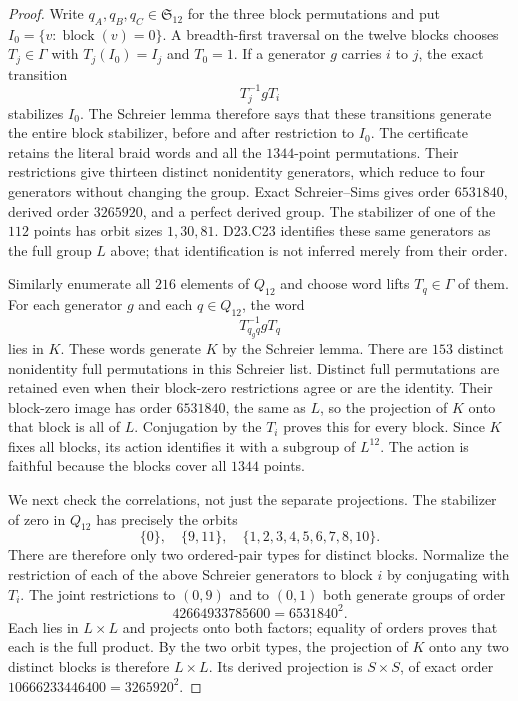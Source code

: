 \begin{proof}
Write $q_A,q_B,q_C\in\mathfrak S_{12}$ for the three block
permutations and put $I_0=\{v:\operatorname{block}(v)=0\}$.
A breadth-first traversal on the twelve blocks chooses
$T_j\in\Gamma$ with $T_j(I_0)=I_j$ and $T_0=1$. If a
generator $g$ carries $i$ to $j$, the exact transition
\[
                    T_j^{-1}gT_i
\]
stabilizes $I_0$. The Schreier lemma therefore says that these
transitions generate the entire block stabilizer, before and
after restriction to $I_0$. The certificate retains the literal
braid words and all the $1344$-point permutations. Their
restrictions give thirteen distinct nonidentity generators,
which reduce to four generators without changing the group.
Exact Schreier--Sims gives order $6531840$, derived order
$3265920$, and a perfect derived group. The stabilizer of one
of the $112$ points has orbit sizes $1,30,81$. D23.C23
identifies these same generators as the full group $L$ above;
that identification is not inferred merely from their order.

Similarly enumerate all $216$ elements of $Q_{12}$ and choose
word lifts $T_q\in\Gamma$ of them. For each generator $g$ and
each $q\in Q_{12}$, the word
\[
                       T_{q_gq}^{-1}gT_q
\]
lies in $K$. These words generate $K$ by the Schreier lemma.
There are $153$ distinct nonidentity full permutations in this
Schreier list. Distinct full permutations are retained even when
their block-zero restrictions agree or are the identity.
Their block-zero image has order $6531840$, the same as $L$, so the
projection of $K$ onto that block is all of $L$. Conjugation
by the $T_i$ proves this for every block. Since $K$ fixes all
blocks, its action identifies it with a subgroup of $L^{12}$.
The action is faithful because the blocks cover all $1344$
points.

We next check the correlations, not just the separate projections.
The stabilizer of zero in $Q_{12}$ has precisely the orbits
\[
 \{0\},\quad\{9,11\},\quad\{1,2,3,4,5,6,7,8,10\}.
\]
There are therefore only two ordered-pair types for distinct
blocks. Normalize the restriction of each of the above
Schreier generators to block $i$ by conjugating with $T_i$.
The joint restrictions to $(0,9)$ and to $(0,1)$ both generate
groups of order
\[
          42664933785600=6531840^2.
\]
Each lies in $L\times L$ and projects onto both factors;
equality of orders proves that each is the full product.
By the two orbit types, the projection of $K$ onto any two
distinct blocks is therefore $L\times L$. Its derived
projection is $S\times S$, of exact order
$10666233446400=3265920^2$.


\end{proof}

